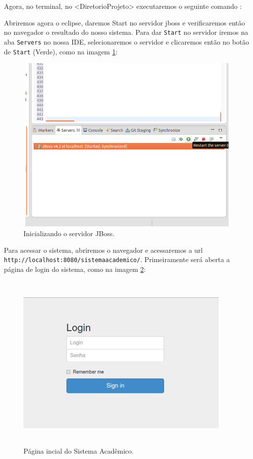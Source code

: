 Agora, no terminal, no <DiretorioProjeto> executaremos o seguinte comando :

\begin{framed}
	
\end{framed}

Abriremos agora o eclipse, daremos Start no servidor jboss e verificaremos então
no navegador o resultado do nosso sistema. Para dar \texttt{Start} no servidor
iremos na aba \texttt{Servers} no nossa IDE, selecionaremos o
servidor e clicaremos então no botão de \texttt{Start} (Verde), como na imagem
\ref{server_start}:
\begin{figure}[H]
	\centering
	\includegraphics[width=400pt,height=250pt]{imgs/tutorial-mdarte-0015.png}
	\caption{Inicializando o servidor JBoss.}
	\label{server_start}
\end{figure}

Para acessar o sistema, abriremos o navegador e acessaremos a url
\texttt{http://localhost:8080/sistemaacademico/}. Primeiramente será aberta a
página de login do sistema, como na imagem \ref{pagina_inicial}:
\begin{figure}[H]
	\centering
	\includegraphics[width=300pt,height=250pt]{imgs/tutorial-mdarte-0013.png}
	\caption{Página incial do Sistema Acadêmico.}
	\label{pagina_inicial}
\end{figure}